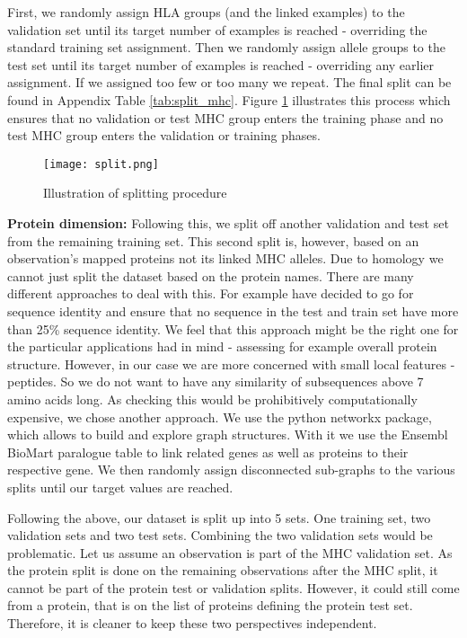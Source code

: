 \documentclass[msc,deptreport,ai]{infthesis} %
\begin{document}
			First, we randomly assign \gls{HLA} groups (and the linked examples) to the validation set until its target number of examples is reached - overriding the standard training set assignment. Then we randomly assign allele groups to the test set until its target number of examples is reached - overriding any earlier assignment. If we assigned too few or too many we repeat. The final split can be found in Appendix Table \ref{tab:split_mhc}. Figure \ref{fig:mhc_split} illustrates this process which ensures that no validation or test \gls{MHC} group enters the training phase and no test \gls{MHC} group enters the validation or training phases.
			
			\begin{figure}
				\texttt{[image: split.png]} 
				\caption{Illustration of splitting procedure}
				\label{fig:mhc_split}
			\end{figure}
	
			\textbf{Protein dimension:} Following this, we split off another validation and test set from the remaining training set. This second split is, however, based on an observation's mapped proteins not its linked \gls{MHC} alleles. Due to homology we cannot just split the dataset based on the protein names. There are many different approaches to deal with this. For example \cite{rao_evaluating_2019} have decided to go for sequence identity and ensure that no sequence in the test and train set have more than 25\% sequence identity. We feel that this approach might be the right one for the particular applications \cite{rao_evaluating_2019} had in mind - assessing for example overall protein structure. However, in our case we are more concerned with small local features - peptides. So we do not want to have any similarity of subsequences above 7 amino acids long. As checking this would be prohibitively computationally expensive, we chose another approach. We use the python networkx package, which allows to build and explore graph structures. With it we use the  Ensembl BioMart paralogue table \cite{ensembl_biomart_2021} to link related genes as well as proteins to their respective gene. We then randomly assign disconnected sub-graphs to the various splits until our target values are reached.
			
			Following the above, our dataset is split up into 5 sets. One training set, two validation sets and two test sets. Combining the two validation sets would be problematic. Let us assume an observation is part of the \gls{MHC} validation set. As the protein split is done on the remaining observations after the \gls{MHC} split, it cannot be part of the protein test or validation splits. However, it could still come from a protein, that is on the list of proteins defining the protein test set. Therefore, it is cleaner to keep these two perspectives independent.
			
\end{document}
